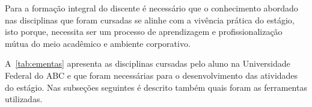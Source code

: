 \documentclass[
  12pt,            %
  openany,
  oneside,
  a4paper,         %
  english,      %
  brazil
]{article}
\numberwithin{figure}{section}
\numberwithin{table}{section}
\begin{document}
Para a formação integral do discente é necessário que o conhecimento abordado nas disciplinas que foram cursadas se alinhe com a vivência prática do estágio, isto porque, necessita ser um processo de aprendizagem e profissionalização mútua do meio acadêmico e ambiente corporativo.

A~\autoref{tab:ementas} apresenta as disciplinas cursadas pelo aluno na Universidade Federal do ABC e que foram necessárias para o desenvolvimento das atividades do estágio. Nas subseções seguintes é descrito também quais foram as ferramentas utilizadas.

%
%
%
%
%
%
%
%
%
%
%
%
\end{document}
